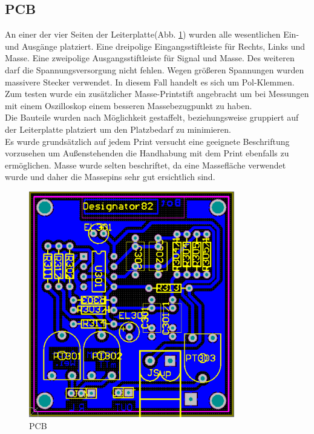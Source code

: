 \subsection{PCB}\label{subsec:4.1.4}
An einer der vier Seiten der Leiterplatte(Abb. \ref{fig:4.1.4.1}) wurden alle wesentlichen Ein- und Ausgänge platziert. Eine dreipolige Eingangsstiftleiste für Rechts, Links und Masse. Eine zweipolige Ausgangsstiftleiste für Signal und Masse. Des weiteren darf die Spannungsversorgung nicht fehlen. Wegen größeren Spannungen wurden massivere Stecker verwendet. In diesem Fall handelt es sich um Pol-Klemmen. Zum testen wurde ein zusätzlicher Masse-Printstift angebracht um bei Messungen mit einem Oszilloskop einem besseren Massebezugpunkt zu haben.\\
Die Bauteile wurden nach Möglichkeit gestaffelt, beziehungsweise gruppiert auf der Leiterplatte platziert um den Platzbedarf zu minimieren.\\
Es wurde grundsätzlich auf jedem Print versucht eine geeignete Beschriftung vorzusehen um Außenstehenden die Handhabung mit dem Print ebenfalls zu ermöglichen. Masse wurde selten beschriftet, da eine Massefläche verwendet wurde und daher die Massepins sehr gut ersichtlich sind.
\begin{figure} [H]
	\centering
	\includegraphics[width=0.8\textwidth]{img/Print3/3mTTWeicheruAddierer-PCB.PNG}
	\caption{PCB}
	\label {fig:4.1.4.1}
\end{figure}









